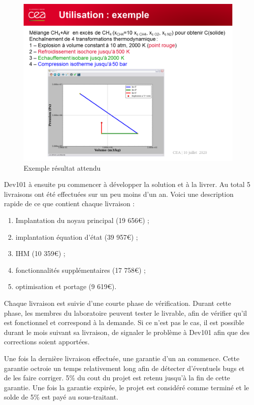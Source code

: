 \begin{figure}[h]
\centering
\includegraphics[scale=0.5]{demo_maquette.png}
\caption{Exemple résultat attendu} 
\label{reu_lancement}
\end{figure}

Dev101 à ensuite pu commencer à développer la solution et à la livrer. Au total 5 livraisons ont été effectuées sur un peu moins d’un an. Voici une description rapide de ce que contient chaque livraison : 
\begin{enumerate}
\item Implantation du noyau principal (19 656€) ;
\item implantation équation d’état (39 957€) ;
\item IHM (10 359€) ;
\item fonctionnalités supplémentaires (17 758€) ;
\item optimisation et portage (9 619€).
\end{enumerate}

Chaque livraison est suivie d’une courte phase de vérification. Durant cette phase, les membres du laboratoire peuvent tester le livrable, afin de vérifier qu’il est fonctionnel et correspond à la demande. Si ce n’est pas le cas, il est possible durant le mois suivant sa livraison, de signaler le problème à Dev101 afin que des corrections soient apportées.

Une fois la dernière livraison effectuée, une garantie d’un an commence. Cette garantie octroie un temps relativement long afin de détecter d’éventuels bugs et de les faire corriger. 5\%  du cout du projet est retenu jusqu'à la fin de cette garantie. Une fois la garantie expirée, le projet est considéré comme terminé et le solde de 5\% est payé au sous-traitant.

